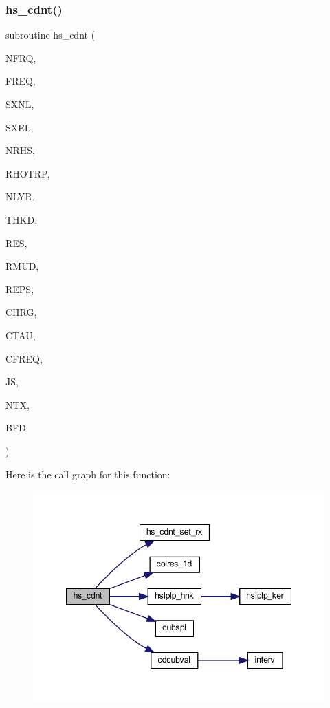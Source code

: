 \subsubsection{\texorpdfstring{hs\+\_\+cdnt()}{hs\_cdnt()}}
{\footnotesize\ttfamily subroutine hs\+\_\+cdnt (\begin{DoxyParamCaption}\item[{integer}]{N\+F\+RQ,  }\item[{real, dimension(nfrq)}]{F\+R\+EQ,  }\item[{real, dimension(4)}]{S\+X\+NL,  }\item[{real, dimension(4)}]{S\+X\+EL,  }\item[{integer}]{N\+R\+HS,  }\item[{real, dimension(nrhs)}]{R\+H\+O\+T\+RP,  }\item[{integer}]{N\+L\+YR,  }\item[{real(kind=ql), dimension(nlyr)}]{T\+H\+KD,  }\item[{real, dimension(nlyr)}]{R\+ES,  }\item[{real(kind=ql), dimension(0\+:nlyr)}]{R\+M\+UD,  }\item[{real, dimension(nlyr)}]{R\+E\+PS,  }\item[{real, dimension(nlyr)}]{C\+H\+RG,  }\item[{real, dimension(nlyr)}]{C\+T\+AU,  }\item[{real, dimension(nlyr)}]{C\+F\+R\+EQ,  }\item[{integer}]{JS,  }\item[{integer}]{N\+TX,  }\item[{complex, dimension(nfrq,1,ntx,3)}]{B\+FD }\end{DoxyParamCaption})}

Here is the call graph for this function\+:\nopagebreak
\begin{figure}[H]
\begin{center}
\leavevmode
\includegraphics[width=347pt]{Leroi__c_8f90_a94e83e050e27be19cb6d665d80c080bf_cgraph}
\end{center}
\end{figure}
\mbox{\label{Leroi__c_8f90_a052539a8cd1f0d9736453c9fb65581ca}} 
